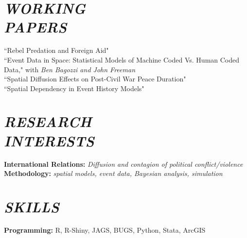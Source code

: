\documentclass[margin, 10pt]{res} %
\begin{document}
\begin{resume}

\section{\footnotesize \textit{WORKING \\ PAPERS}}
	``Rebel Predation and Foreign Aid" \\
	``Event Data in Space: Statistical Models of Machine Coded Vs. Human Coded Data," with \textit{Ben Bagozzi and John Freeman}\\ 
	``Spatial Diffusion Effects on Post-Civil War Peace Duration" \\
	``Spatial Dependency in Event History Models" 


\section{\footnotesize \textit{RESEARCH \\ INTERESTS}} 
\textbf{International Relations:} \textit{Diffusion and contagion of political conflict/violence}\\
\textbf{Methodology:} \textit{spatial models, event data, Bayesian analysis, simulation}


\section{\footnotesize \textit{SKILLS}}
\textbf{Programming:} R, R-Shiny, JAGS, BUGS, Python, Stata, ArcGIS



\end{resume}
\end{document}
